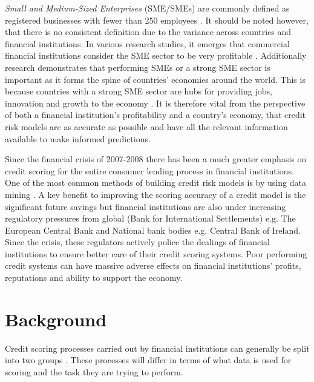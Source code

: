 \textit{Small and Medium-Sized Enterprises} (SME/SMEs) are commonly defined as registered businesses with fewer than 250 employees \citep{ifc_sme_2009}. It should be noted however, that there is no consistent definition due to the variance across countries and financial institutions. In various research studies, it emerges that commercial financial institutions consider the SME sector to be very profitable \citep{beck_bank_2008}. Additionally research demonstrates that performing SMEs or a strong SME sector is important as it forms the spine of countries' economies around the world. This is because countries with a strong SME sector are hubs for providing jobs, innovation and growth to the economy \citep{craig_sba-guaranteed_2004}. It is therefore vital from the perspective of both a financial institution's profitability and a country's economy, that credit risk models are as accurate as possible and have all the relevant information available to make informed predictions.

Since the financial crisis of 2007-2008 there has been a much greater emphasis on credit scoring for the entire consumer lending process in financial institutions. One of the most common methods of building credit risk models is by using data mining \citep{baesens_50_2009}. A key benefit to improving the scoring accuracy of a credit model is the significant future savings \citep{west_neural_2000} but financial institutions are also under increasing regulatory pressures from global (Bank for International Settlements) e.g. The European Central Bank and National bank bodies e.g. Central Bank of Ireland. Since the crisis, these regulators actively police the dealings of financial institutions to ensure better care of their credit scoring systems. Poor performing credit systems can have massive adverse effects on financial institutions' profits, reputations and ability to support the economy.


\section{Background}

Credit scoring processes carried out by financial institutions can generally be split into two groups \citep{bijak_does_2012}. These processes will differ in terms of what data is used for scoring and the task they are trying to perform. 


